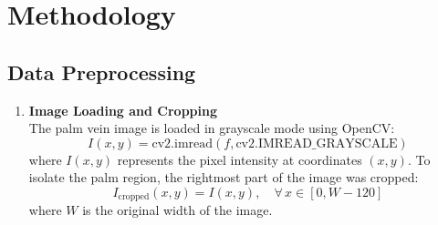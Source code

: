 \section{Methodology}


\subsection{Data Preprocessing}

\begin{enumerate}
    \item \textbf{Image Loading and Cropping} \\
    The palm vein image is loaded in grayscale mode using OpenCV: 
    \[
    I(x, y) = \text{cv2.imread}(f, \text{cv2.IMREAD\_GRAYSCALE})
    \]
    where \( I(x, y) \) represents the pixel intensity at coordinates \( (x, y) \). To isolate the palm region, the rightmost part of the image was cropped:
    \[
    I_{\text{cropped}}(x, y) = I(x, y), \quad \forall \, x \in [0, W-120]
    \]
    where \( W \) is the original width of the image.


\end{enumerate}
